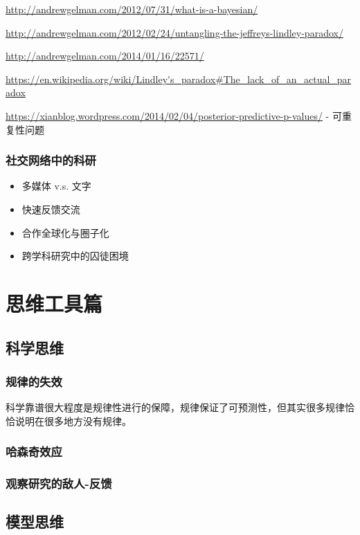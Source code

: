 \documentclass[]{book}
\providecommand{\tightlist}{%
  \setlength{\itemsep}{0pt}\setlength{\parskip}{0pt}}
\begin{document}
\url{http://andrewgelman.com/2012/07/31/what-is-a-bayesian/}

\url{http://andrewgelman.com/2012/02/24/untangling-the-jeffreys-lindley-paradox/}

\url{http://andrewgelman.com/2014/01/16/22571/}

\url{https://en.wikipedia.org/wiki/Lindley's_paradox\#The_lack_of_an_actual_paradox}

\url{https://xianblog.wordpress.com/2014/02/04/posterior-predictive-p-values/}
- 可重复性问题

\subsection{社交网络中的科研}

\begin{itemize}
\tightlist
\item
  多媒体 v.s. 文字
\item
  快速反馈交流
\item
  合作全球化与圈子化
\item
  跨学科研究中的囚徒困境
\end{itemize}

\chapter{思维工具篇}\label{thought}

\section{科学思维}

\subsection{规律的失效}

科学靠谱很大程度是规律性进行的保障，规律保证了可预测性，但其实很多规律恰恰说明在很多地方没有规律。

\subsection{哈森奇效应}

\subsection{观察研究的敌人-反馈}\label{-}

\section{模型思维}
\end{document}
